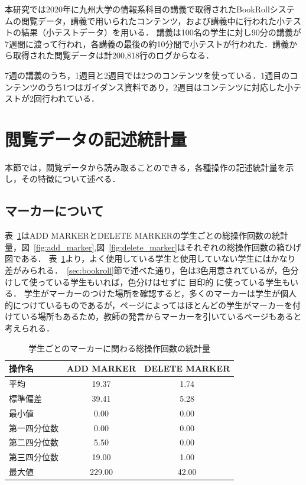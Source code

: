 \documentclass[a4paper,12pt]{ltjsreport}
\begin{document}
本研究では2020年に九州大学の情報系科目の講義で取得されたBookRollシステムの閲覧データ，講義で用いられたコンテンツ，および講義中に行われた小テストの結果（小テストデータ）を用いる．
講義は100名の学生に対し90分の講義が7週間に渡って行われ，各講義の最後の約10分間で小テストが行われた．講義から取得された閲覧データは計200,818行のログからなる．

7週の講義のうち，1週目と2週目では2つのコンテンツを使っている．1週目のコンテンツのうち1つはガイダンス資料であり，2週目はコンテンツに対応した小テストが2回行われている．

\section{閲覧データの記述統計量}\label{sec:toukei}

本節では，閲覧データから読み取ることのできる，各種操作の記述統計量を示し，その特徴について述べる．

\subsection*{マーカーについて}

表~\ref{tb:marker}はADD MARKERとDELETE MARKERの学生ごとの総操作回数の統計量，図~\ref{fig:add_marker},図~\ref{fig:delete_marker}はそれぞれの総操作回数の箱ひげ図である． 
表~\ref{tb:marker}より，よく使用している学生と使用していない学生にはかなり差がみられる．~\ref{sec:bookroll}節で述べた通り，色は3色用意されているが，色分けして使っている学生もいれば，色分けはせずに
目印的
に使っている学生もいる．
学生がマーカーのつけた場所を確認すると，多くのマーカーは学生が個人的につけているものであるが，ページによってはほとんどの学生がマーカーを付けている場所もあるため，教師の発言からマーカーを引いているページもあると考えられる．%

\begin{table}[bp]
  \centering
  \caption{学生ごとのマーカーに関わる総操作回数の統計量}
  \label{tb:marker}
  \begin{tabular}{l||c|c}
    操作名 & ADD MARKER & DELETE MARKER \\ \hline\hline
    平均 & 19.37 & 1.74 \\ \hline
    標準偏差 & 39.41 & 5.28 \\ \hline
    最小値 & 0.00 & 0.00 \\ \hline
    第一四分位数 & 0.00 & 0.00 \\ \hline
    第二四分位数 & 5.50 & 0.00 \\ \hline
    第三四分位数 & 19.00 & 1.00 \\ \hline
    最大値 & 229.00 & 42.00 \\ \hline
  \end{tabular}
\end{table}
\end{document}
